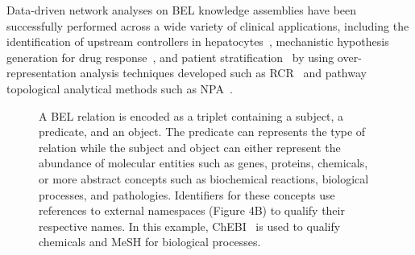 Data-driven network analyses on \ac{BEL} knowledge assemblies have been successfully performed across a wide variety of clinical applications, including the identification of upstream controllers in hepatocytes~\cite{Deehan2012}, mechanistic hypothesis generation for drug response~\cite{Laifenfeld2014}, and patient stratification~\cite{Laifenfeld2012} by using over-representation analysis techniques developed such as \ac{RCR}~\cite{Catlett2013} and pathway topological analytical methods such as \ac{NPA}~\cite{Martin2014}.

\begin{figure}
    \captionsetup{format=plain}
    \caption[The Schema of a BEL Relation]{A BEL relation is encoded as a triplet containing a subject, a predicate, and an object. The predicate can represents the type of relation while the subject and object can either represent the abundance of molecular entities such as genes, proteins, chemicals, or more abstract concepts such as biochemical reactions, biological processes, and pathologies. Identifiers for these concepts use references to external namespaces (Figure 4B) to qualify their respective names. In this example, \ac{ChEBI}~\cite{Hastings2013} is used to qualify chemicals and \ac{MeSH}\cite{ROGERS1963} for biological processes.}
    \label{fig:bel_relation}
\end{figure}

